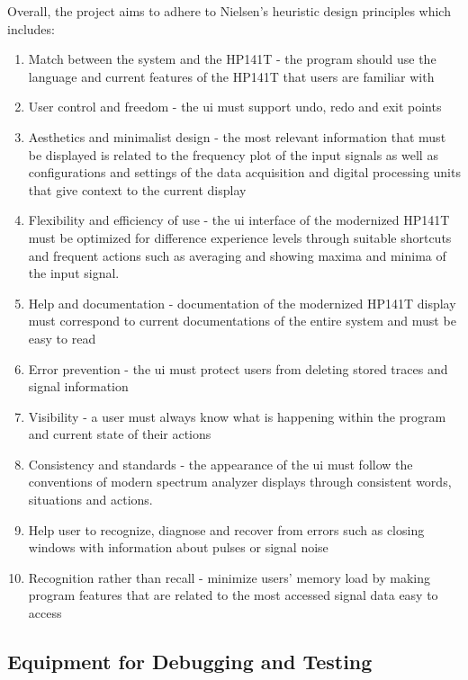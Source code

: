 \documentclass[class=report,11pt,crop=false]{standalone}
\begin{document}
	Overall, the project aims to adhere to Nielsen's heuristic design principles which includes:
	\begin{enumerate}
		\item
		Match between the system and the HP141T -  the program should use the language and current features of the HP141T that users are familiar with
		\item 
		User control and freedom - the \acrshort{ui} must support undo, redo and exit points
		\item 
		Aesthetics and minimalist design - the most relevant information that must be displayed is related to the frequency plot of the input signals as well as configurations and settings of the data acquisition and digital processing units that give context to the current display
		\item 
		Flexibility and efficiency of use - the \acrshort{ui} interface of the modernized HP141T must be optimized for difference experience levels through suitable shortcuts and frequent actions such as averaging and showing maxima and minima of the input signal.
		\item 
		Help and documentation - documentation of the modernized HP141T display must correspond to current documentations of the entire system and must be easy to read
		\item 
		Error prevention - the \acrshort{ui} must protect users from deleting stored traces and signal information
		\item 
		Visibility - a user must always know what is happening within the program and current state of their actions
		\item 
		Consistency and standards - the appearance of the \acrshort{ui} must follow the conventions of modern spectrum analyzer displays through consistent words, situations and actions.
		\item 
		Help user to recognize, diagnose and recover from errors such as closing windows with information about pulses or signal noise
		\item 
		Recognition rather than recall - minimize users' memory load by making program features that are related to the most accessed signal data easy to access
	\end{enumerate}
	
	\subsection{Equipment for Debugging and Testing}
	
\end{document}
